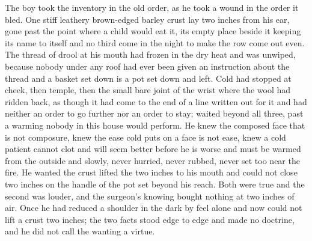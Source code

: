 The boy took the inventory in the old order, as he took a wound in the order it bled. One stiff leathery brown-edged barley crust lay two inches from his ear, gone past the point where a child would eat it, its empty place beside it keeping its name to itself and no third come in the night to make the row come out even. The thread of drool at his mouth had frozen in the dry heat and was unwiped, because nobody under any roof had ever been given an instruction about the thread and a basket set down is a pot set down and left. Cold had stopped at cheek, then temple, then the small bare joint of the wrist where the wool had ridden back, as though it had come to the end of a line written out for it and had neither an order to go further nor an order to stay;  waited beyond all three, past a warming nobody in this house would perform. He knew the composed face that is not composure, knew the ease cold puts on a face is not ease, knew a cold patient cannot clot and will seem better before he is worse and must be warmed from the outside and slowly, never hurried, never rubbed, never set too near the fire. He wanted the crust lifted the two inches to his mouth and could not close two inches on the handle of the pot set beyond his reach. Both were true and the second was louder, and the surgeon's knowing bought nothing at two inches of air. Once he had reduced a shoulder in the dark by feel alone and now could not lift a crust two inches; the two facts stood edge to edge and made no doctrine, and he did not call the wanting a virtue.

